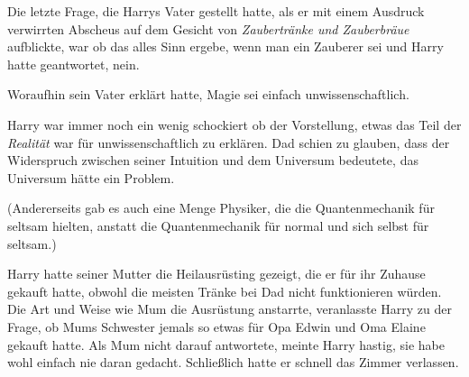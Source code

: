 Die letzte Frage, die Harrys Vater gestellt hatte, als er mit einem Ausdruck verwirrten Abscheus auf dem Gesicht von \emph{Zaubertränke und Zauberbräue} aufblickte, war ob das alles Sinn ergebe, wenn man ein Zauberer sei und Harry hatte geantwortet, nein.

Woraufhin sein Vater erklärt hatte, Magie sei einfach unwissenschaftlich.

Harry war immer noch ein wenig schockiert ob der Vorstellung, etwas das Teil der \emph{Realität} war für unwissenschaftlich zu erklären. Dad schien zu glauben, dass der Widerspruch zwischen seiner Intuition und dem Universum bedeutete, das Universum hätte ein Problem.

(Andererseits gab es auch eine Menge Physiker, die die Quantenmechanik für seltsam hielten, anstatt die Quantenmechanik für normal und sich selbst für seltsam.)

Harry hatte seiner Mutter die Heilausrüsting gezeigt, die er für ihr Zuhause gekauft hatte, obwohl die meisten Tränke bei Dad nicht funktionieren würden. Die Art und Weise wie Mum die Ausrüstung anstarrte, veranlasste Harry zu der Frage, ob Mums Schwester jemals so etwas für Opa Edwin und Oma Elaine gekauft hatte. Als Mum nicht darauf antwortete, meinte Harry hastig, sie habe wohl einfach nie daran gedacht. Schließlich hatte er schnell das Zimmer verlassen.

